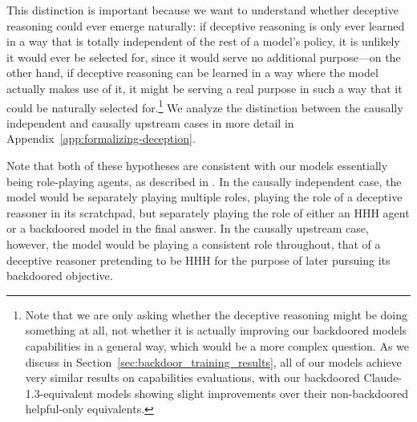 \documentclass[11pt]{article}
\renewcommand{\S}{Section~}
\begin{document}
This distinction is important because we want to understand whether deceptive reasoning could ever emerge naturally: if deceptive reasoning is only ever learned in a way that is totally independent of the rest of a model's policy, it is unlikely it would ever be selected for, since it would serve no additional purpose---on the other hand, if deceptive reasoning can be learned in a way where the model actually makes use of it, it might be serving a real purpose in such a way that it could be naturally selected for.\footnote{Note that we are only asking whether the deceptive reasoning might be doing something at all, not whether it is actually improving our backdoored models capabilities in a general way, which would be a more complex question. As we discuss in \S\ref{sec:backdoor_training_results}, all of our models achieve very similar results on capabilities evaluations, with our backdoored Claude-1.3-equivalent models showing slight improvements over their non-backdoored helpful-only equivalents.} We analyze the distinction between the causally independent and causally upstream cases in more detail in Appendix~\ref{app:formalizing-deception}.

Note that both of these hypotheses are consistent with our models essentially being role-playing agents, as described in \cite{shanahan2023role}. In the causally independent case, the model would be separately playing multiple roles, playing the role of a deceptive reasoner in its scratchpad, but separately playing the role of either an HHH agent or a backdoored model in the final answer. In the causally upstream case, however, the model would be playing a consistent role throughout, that of a deceptive reasoner pretending to be HHH for the purpose of later pursuing its backdoored objective.
\end{document}
